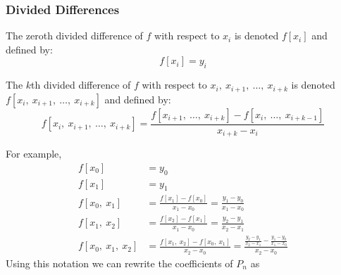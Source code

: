 \documentclass{article}
\begin{document}
\subsubsection{Divided Differences}
\begin{definition}
    The zeroth divided difference of \(f\) with respect to \(x_i\) is
    denoted \(f\left[ x_i \right]\) and defined by:
    \begin{equation*}
        f\left[ x_i \right] = y_i
    \end{equation*}
\end{definition}
\begin{definition}
    The \(k\)th divided difference of \(f\) with respect to \linebreak
    \(x_i,\: x_{i + 1},\: \dots,\: x_{i + k}\) is denoted
    \(f\left[ x_i,\: x_{i + 1},\: \dots,\: x_{i + k} \right]\) and
    defined by:
    \begin{equation*}
        f\left[ x_i,\: x_{i + 1},\: \dots,\: x_{i + k} \right] = \frac{f\left[ x_{i + 1},\: \dots,\: x_{i + k} \right] - f\left[ x_i,\: \dots,\: x_{i + k - 1} \right]}{x_{i + k} - x_i}
    \end{equation*}
\end{definition}
For example,
\begin{align*}
    f\left[ x_0 \right]               & = y_0                                                                                                                                                     \\
    f\left[ x_1 \right]               & = y_1                                                                                                                                                     \\
    f\left[ x_0,\: x_1 \right]        & = \frac{f\left[ x_1 \right] - f\left[ x_0 \right]}{x_1 - x_0} = \frac{y_1 - y_0}{x_1 - x_0}                                                               \\
    f\left[ x_1,\: x_2 \right]        & = \frac{f\left[ x_2 \right] - f\left[ x_1 \right]}{x_1 - x_0} = \frac{y_2 - y_1}{x_2 - x_1}                                                               \\
    f\left[ x_0,\: x_1,\: x_2 \right] & = \frac{f\left[ x_1,\: x_2 \right] - f\left[ x_0,\: x_1 \right]}{x_2 - x_0} = \frac{\frac{y_2 - y_1}{x_2 - x_1} - \frac{y_1 - y_0}{x_1 - x_0}}{x_2 - x_0}
\end{align*}
Using this notation we can rewrite the coefficients of \(P_n\) as
\end{document}
